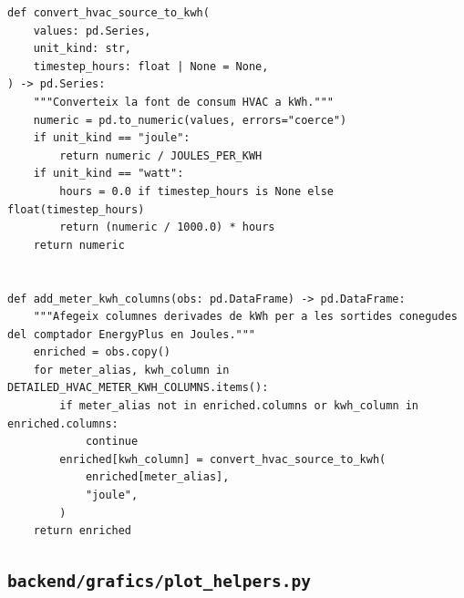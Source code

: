 \documentclass[10pt,a4paper]{article}
\begin{document}
\begin{lstlisting}[style=studioPython,caption={backend/grafics/observation\_columns.py},label={lst:backend-grafics-observation-columns-py}]
def convert_hvac_source_to_kwh(
    values: pd.Series,
    unit_kind: str,
    timestep_hours: float | None = None,
) -> pd.Series:
    """Converteix la font de consum HVAC a kWh."""
    numeric = pd.to_numeric(values, errors="coerce")
    if unit_kind == "joule":
        return numeric / JOULES_PER_KWH
    if unit_kind == "watt":
        hours = 0.0 if timestep_hours is None else float(timestep_hours)
        return (numeric / 1000.0) * hours
    return numeric


def add_meter_kwh_columns(obs: pd.DataFrame) -> pd.DataFrame:
    """Afegeix columnes derivades de kWh per a les sortides conegudes del comptador EnergyPlus en Joules."""
    enriched = obs.copy()
    for meter_alias, kwh_column in DETAILED_HVAC_METER_KWH_COLUMNS.items():
        if meter_alias not in enriched.columns or kwh_column in enriched.columns:
            continue
        enriched[kwh_column] = convert_hvac_source_to_kwh(
            enriched[meter_alias],
            "joule",
        )
    return enriched
\end{lstlisting}


\subsection{\texorpdfstring{\texttt{backend/grafics/plot\_helpers.py}}{backend/grafics/plot\_helpers.py}}
\end{document}
